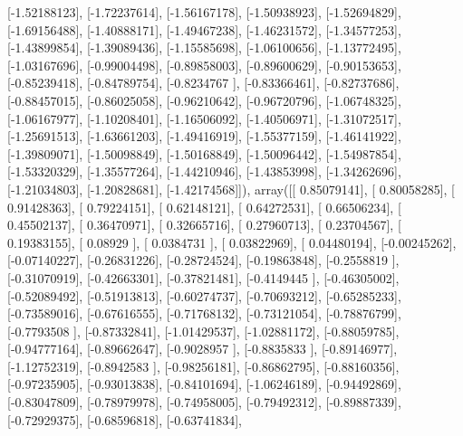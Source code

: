 \documentclass{article}
\begin{document}
       [-1.52188123],
       [-1.72237614],
       [-1.56167178],
       [-1.50938923],
       [-1.52694829],
       [-1.69156488],
       [-1.40888171],
       [-1.49467238],
       [-1.46231572],
       [-1.34577253],
       [-1.43899854],
       [-1.39089436],
       [-1.15585698],
       [-1.06100656],
       [-1.13772495],
       [-1.03167696],
       [-0.99004498],
       [-0.89858003],
       [-0.89600629],
       [-0.90153653],
       [-0.85239418],
       [-0.84789754],
       [-0.8234767 ],
       [-0.83366461],
       [-0.82737686],
       [-0.88457015],
       [-0.86025058],
       [-0.96210642],
       [-0.96720796],
       [-1.06748325],
       [-1.06167977],
       [-1.10208401],
       [-1.16506092],
       [-1.40506971],
       [-1.31072517],
       [-1.25691513],
       [-1.63661203],
       [-1.49416919],
       [-1.55377159],
       [-1.46141922],
       [-1.39809071],
       [-1.50098849],
       [-1.50168849],
       [-1.50096442],
       [-1.54987854],
       [-1.53320329],
       [-1.35577264],
       [-1.44210946],
       [-1.43853998],
       [-1.34262696],
       [-1.21034803],
       [-1.20828681],
       [-1.42174568]]), array([[ 0.85079141],
       [ 0.80058285],
       [ 0.91428363],
       [ 0.79224151],
       [ 0.62148121],
       [ 0.64272531],
       [ 0.66506234],
       [ 0.45502137],
       [ 0.36470971],
       [ 0.32665716],
       [ 0.27960713],
       [ 0.23704567],
       [ 0.19383155],
       [ 0.08929   ],
       [ 0.0384731 ],
       [ 0.03822969],
       [ 0.04480194],
       [-0.00245262],
       [-0.07140227],
       [-0.26831226],
       [-0.28724524],
       [-0.19863848],
       [-0.2558819 ],
       [-0.31070919],
       [-0.42663301],
       [-0.37821481],
       [-0.4149445 ],
       [-0.46305002],
       [-0.52089492],
       [-0.51913813],
       [-0.60274737],
       [-0.70693212],
       [-0.65285233],
       [-0.73589016],
       [-0.67616555],
       [-0.71768132],
       [-0.73121054],
       [-0.78876799],
       [-0.7793508 ],
       [-0.87332841],
       [-1.01429537],
       [-1.02881172],
       [-0.88059785],
       [-0.94777164],
       [-0.89662647],
       [-0.9028957 ],
       [-0.8835833 ],
       [-0.89146977],
       [-1.12752319],
       [-0.8942583 ],
       [-0.98256181],
       [-0.86862795],
       [-0.88160356],
       [-0.97235905],
       [-0.93013838],
       [-0.84101694],
       [-1.06246189],
       [-0.94492869],
       [-0.83047809],
       [-0.78979978],
       [-0.74958005],
       [-0.79492312],
       [-0.89887339],
       [-0.72929375],
       [-0.68596818],
       [-0.63741834],
\end{document}
